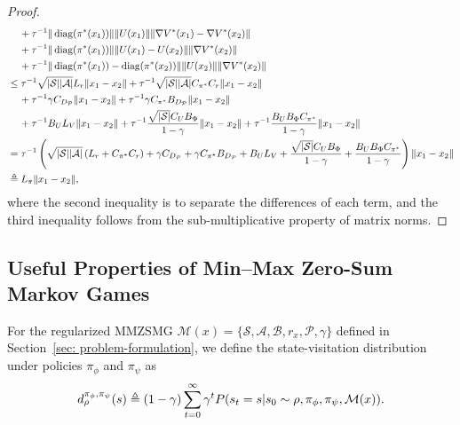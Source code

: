 \documentclass{article}
\theoremstyle{plain}
\theoremstyle{definition}
\theoremstyle{remark}
\def\cA{\mathcal A}
\def\cB{\mathcal B}
\def\cM{\mathcal M}
\def\cP{\mathcal P}
\def\cS{\mathcal S}
\def\bydef{\triangleq}
\DeclareMathOperator{\diag}{diag}
\begin{document}
\begin{proof}
\begin{align}
         & \quad \,+ \tau^{-1} \|\diag(\pi^*(x_1)) \| \| U(x_1) \| \| \nabla V^*(x_1) - \nabla V^*(x_2) \| \notag\\
         & \quad \,+ \tau^{-1} \|\diag(\pi^*(x_1)) \| \| U(x_1) - U(x_2) \| \| \nabla V^*(x_2) \| \notag \\ 
         & \quad \,+ \tau^{-1} \| \diag(\pi^*(x_1)) - \diag(\pi^*(x_2)) \| \| U(x_2) \| \| \nabla V^*(x_2) \| \notag\\
         & \leq \tau^{-1} \sqrt{|\cS||\cA|} L_r \| x_1 - x_2 \| + \tau^{-1} \sqrt{|\cS||\cA|} C_{\pi^*} C_r \| x_1 - x_2 \| \notag \\
         & \quad \,+ \tau^{-1} \gamma C_{D_\cP} \| x_1 - x_2 \| + \tau^{-1} \gamma C_{\pi^*} B_{D_\cP}\| x_1 - x_2\| \notag \\
         & \quad \,+ \tau^{-1}B_U L_V \| x_1 - x_2 \| + \tau^{-1} \frac{\sqrt{|\cS|}C_U B_\Phi}{1-\gamma} \| x_1 - x_2 \| + \tau^{-1}   \frac{B_U B_\Phi C_{\pi^*}}{1-\gamma}  \| x_1 - x_2 \| \notag \\
         & = \tau^{-1}\left(\sqrt{|\cS||\cA|} \left( L_r + C_{\pi^*} C_r \right) + \gamma C_{D_\cP} + \gamma C_{\pi^*} B_{D_\cP} + B_U L_V + \frac{\sqrt{|\cS|}C_U B_\Phi}{1-\gamma} +   \frac{B_U B_\Phi C_{\pi^*}}{1-\gamma}  \right) \|x_1 - x_2\| \\
         & \bydef L_\pi \| x_1 - x_2 \|,
    \end{align}
    where the second inequality is to separate the differences of each term, and the third inequality follows from the sub-multiplicative property of matrix norms.
\end{proof}

\subsection{Useful Properties of Min--Max Zero-Sum Markov Games}
\label{appendix: useful-properties-of-min-max-zero-sum-markov-game}
For the regularized MMZSMG $\cM(x) = \{\cS,\cA,\cB,r_x,\cP,\gamma\}$ defined in Section~\ref{sec: problem-formulation}, 
we define the state-visitation distribution under policies $\pi_\phi$ and $\pi_\psi$ as
\begin{align}
    d^{\pi_\phi,\pi_\psi}_\rho(s) \bydef (1-\gamma) \sum_{t=0}^{\infty} \gamma^t P(s_t = s | s_0 \sim \rho, \pi_\phi, \pi_\psi, \cM(x)).\notag
\end{align}
\end{document}
